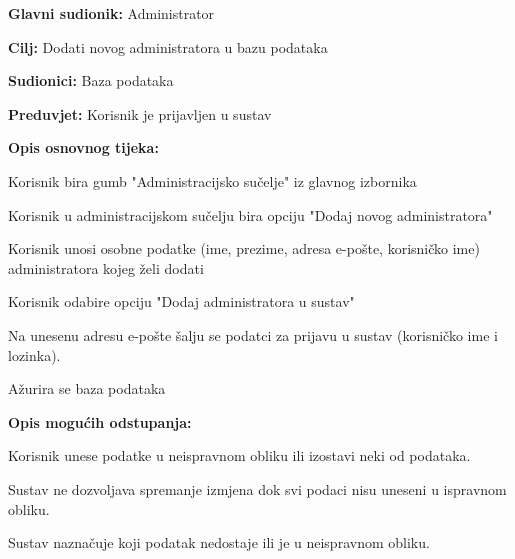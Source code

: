 					\noindent {}
					\begin{packed_item}
	
						\item \textbf{Glavni sudionik: } Administrator
						\item  \textbf{Cilj:} Dodati novog administratora u bazu podataka
						\item  \textbf{Sudionici:} Baza podataka
						\item  \textbf{Preduvjet:} Korisnik je prijavljen u sustav
						\item  \textbf{Opis osnovnog tijeka:}
						
						\item[] \begin{packed_enum}
	
							\item Korisnik bira gumb "Administracijsko sučelje" iz glavnog izbornika
							\item Korisnik u administracijskom sučelju bira opciju "Dodaj novog administratora"
							\item Korisnik unosi osobne podatke (ime, prezime, adresa e-pošte, korisničko ime) administratora kojeg želi dodati
							\item Korisnik odabire opciju "Dodaj administratora u sustav"
							\item Na unesenu adresu e-pošte šalju se podatci za prijavu u sustav (korisničko ime i lozinka).
							\item Ažurira se baza podataka
							

					
						\end{packed_enum}

						\item  \textbf{Opis mogućih odstupanja:}
						
						\item[] \begin{packed_item}
							
							\item[3.a]  Korisnik unese podatke u neispravnom obliku ili izostavi neki od podataka.
							\item[] \begin{packed_enum}
								
								\item Sustav ne dozvoljava spremanje izmjena dok svi podaci nisu uneseni u ispravnom obliku.
								\item Sustav naznačuje koji podatak nedostaje ili je u neispravnom obliku.
								

\end{packed_enum}
\end{packed_item}
\end{packed_item}
